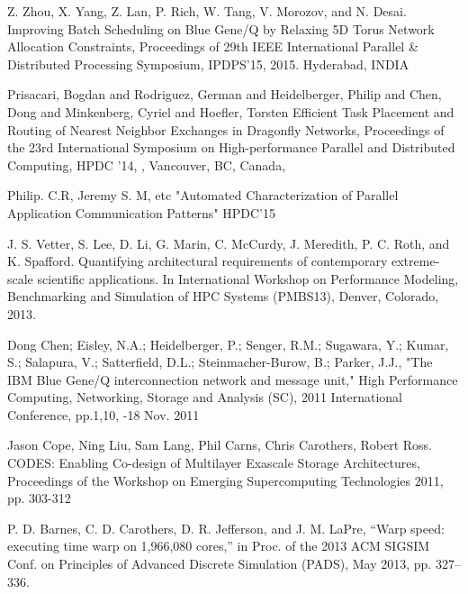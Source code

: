 \documentclass[conference]{IEEEtran}
\begin{document}
\begin{thebibliography}{10}
Z. Zhou, X. Yang, Z. Lan, P. Rich, W. Tang, V. Morozov, and N. Desai.
\newblock Improving Batch Scheduling on Blue Gene/Q by Relaxing 5D Torus Network Allocation Constraints,
\newblock Proceedings of 29th IEEE International Parallel \& Distributed Processing 
Symposium,
\newblock IPDPS'15, 2015.
\newblock Hyderabad, INDIA

Prisacari, Bogdan and Rodriguez, German and Heidelberger, Philip and Chen, Dong and Minkenberg, Cyriel and Hoefler, Torsten
\newblock Efficient Task Placement and Routing of Nearest Neighbor Exchanges in Dragonfly Networks,
\newblock Proceedings of the 23rd International Symposium on High-performance Parallel and Distributed Computing,
\newblock HPDC '14,
,
\newblock  Vancouver, BC, Canada,


Philip. C.R, Jeremy S. M, etc
\newblock "Automated Characterization of Parallel Application Communication Patterns"
\newblock HPDC'15

J. S. Vetter, S. Lee, D. Li, G. Marin, C. McCurdy, J. Meredith, P. C. Roth, and K. Spafford. 
\newblock Quantifying architectural requirements of contemporary extreme-scale scientific applications. 
\newblock In International Workshop on Performance Modeling, Benchmarking and Simulation of HPC Systems (PMBS13), 
\newblock Denver, Colorado, 2013.

Dong Chen; Eisley, N.A.; Heidelberger, P.; Senger, R.M.; Sugawara, Y.; Kumar,
S.; Salapura, V.; Satterfield, D.L.; Steinmacher-Burow, B.; Parker, J.J., 
\newblock "The IBM Blue Gene/Q interconnection network and message unit," 
\newblock High Performance Computing, Networking, Storage and Analysis (SC), 2011 International 
Conference,
\newblock pp.1,10, 
-18 Nov. 2011

Jason Cope, Ning Liu, Sam Lang, Phil Carns, Chris Carothers, Robert Ross.
\newblock CODES: Enabling Co-design of Multilayer Exascale Storage Architectures, 
\newblock Proceedings of the Workshop on Emerging Supercomputing Technologies 2011, pp. 303-312



P. D. Barnes, C. D. Carothers, D. R. Jefferson, and J. M. LaPre, 
\newblock “Warp speed: executing time warp on 1,966,080 cores,”
\newblock in Proc. of the 2013 ACM SIGSIM Conf. on Principles of Advanced Discrete Simulation (PADS),
\newblock May 2013, pp. 327–336.


\end{thebibliography}
\end{document}
